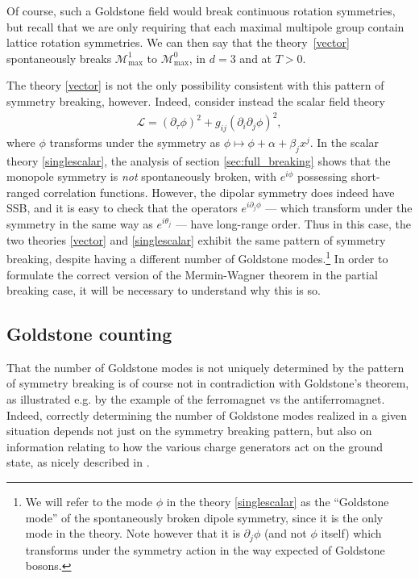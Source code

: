 \documentclass[prb,aps,twocolumn, amsfonts,amsmath,amssymb,nofootinbib,superscriptaddress]{revtex4-2}
\renewcommand{\max}{\text{max}}
\newcommand{\mmax}[1]{\mathcal{M}^{#1}_\max}
\newcommand{\p}{\partial}
\renewcommand{\t}{\theta}
\begin{document}
Of course, such a Goldstone field would break continuous rotation symmetries, but recall that we are only requiring that each maximal multipole group contain lattice rotation symmetries. We can then say that the theory~\eqref{vector} spontaneously breaks $\mmax{1}$ to $\mmax{0}$, in $d=3$ and at $T>0$.

The theory \eqref{vector} is not the only possibility consistent with this pattern of symmetry breaking, however. Indeed, consider instead the scalar field theory 
\begin{align}
\label{singlescalar}    \mathcal{L} = (\partial_\tau\phi)^2 + g_{ij} (\partial_i\partial_j\phi)^2, \end{align}
where $\phi$ transforms under the symmetry as $\phi \mapsto \phi + \alpha + \beta_jx^j$. 
 In the scalar theory \eqref{singlescalar}, the analysis of section \ref{sec:full_breaking} shows that the monopole symmetry is {\it not} spontaneously broken, with $e^{i\phi}$ possessing short-ranged correlation functions. However, the dipolar symmetry does indeed have SSB, and it is easy to check that the operators $e^{i\p_j\phi}$ --- which transform under the symmetry in the same way as $e^{i\t_j}$ --- have long-range order. Thus in this case, the two theories \eqref{vector} and \eqref{singlescalar} exhibit the same pattern of symmetry breaking, despite having a different number of Goldstone modes.\footnote{We will refer to the mode $\phi$ in the theory \eqref{singlescalar} as the ``Goldstone mode'' of the spontaneously broken dipole symmetry, since it is the only mode in the theory. Note however that it is $\p_j\phi$ (and not $\phi$ itself) which transforms under the symmetry action in the way expected of Goldstone bosons.} In order to formulate the correct version of the Mermin-Wagner theorem in the partial breaking case, it will be necessary to understand why this is so.  


\subsection{Goldstone counting} \label{sub:subgroup}

That the number of Goldstone modes is not uniquely determined by the pattern of symmetry breaking is of course not in contradiction with Goldstone's theorem, as illustrated e.g. by the example of the ferromagnet vs the antiferromagnet. Indeed, correctly determining the number of Goldstone modes realized in a given situation depends not just on the symmetry breaking pattern, but also on information relating to how the various charge generators act on the ground state, as nicely described in \cite{watanabe2013redundancies}.
\end{document}
